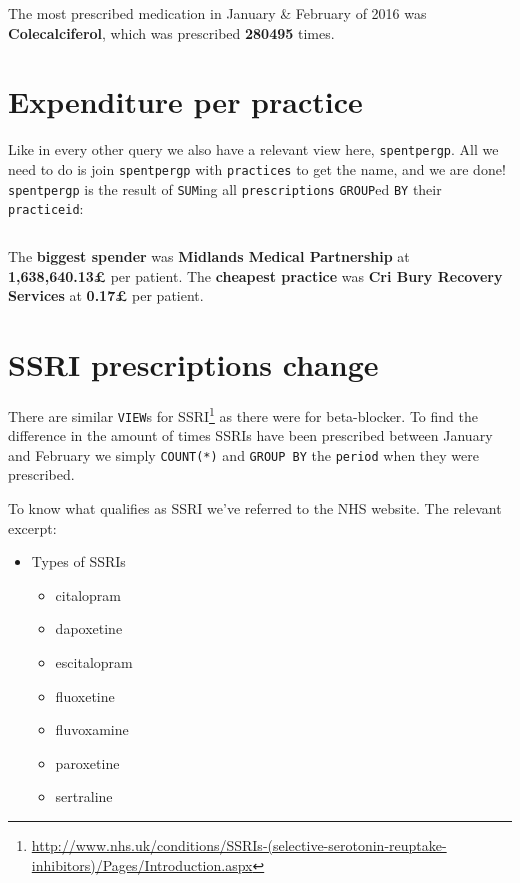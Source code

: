 \documentclass[english,a4paper,]{report}
\renewcommand{\href}[2]{#2\footnote{\url{#1}}}
\providecommand{\tightlist}{%
  \setlength{\itemsep}{0pt}\setlength{\parskip}{0pt}}
\begin{document}
\inputminted[firstline=42,lastline=53]{sql}{src/sql/02-queries.sql}

The most prescribed medication in January \& February of 2016 was
\textbf{Colecalciferol}, which was prescribed \textbf{280495} times.

\section{Expenditure per practice}\label{expenditure-per-practice}

Like in every other query we also have a relevant view here,
\texttt{spentpergp}. All we need to do is join \texttt{spentpergp} with
\texttt{practices} to get the name, and we are done! \texttt{spentpergp}
is the result of \texttt{SUM}ing all \texttt{prescriptions}
\texttt{GROUP}ed \texttt{BY} their \texttt{practiceid}:

\inputminted[firstline=56,lastline=80]{sql}{src/sql/02-queries.sql}

The \textbf{biggest spender} was \textbf{Midlands Medical Partnership}
at \textbf{1,638,640.13£} per patient. The \textbf{cheapest practice}
was \textbf{Cri Bury Recovery Services} at \textbf{0.17£} per patient.

\section{SSRI prescriptions change}\label{ssri-prescriptions-change}

There are similar \texttt{VIEW}s for
\href{http://www.nhs.uk/conditions/SSRIs-(selective-serotonin-reuptake-inhibitors)/Pages/Introduction.aspx}{SSRI}
as there were for beta-blocker. To find the difference in the amount of
times SSRIs have been prescribed between January and February we simply
\texttt{COUNT(*)} and \texttt{GROUP\ BY} the \texttt{period} when they
were prescribed.

To know what qualifies as SSRI we've referred to the NHS website. The
relevant excerpt:

\begin{itemize}
\tightlist
\item
  Types of SSRIs

  \begin{itemize}
  \tightlist
  \item
    citalopram
  \item
    dapoxetine
  \item
    escitalopram
  \item
    fluoxetine
  \item
    fluvoxamine
  \item
    paroxetine
  \item
    sertraline
  \end{itemize}
\end{itemize}
\end{document}

